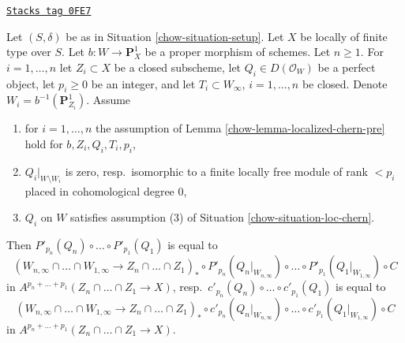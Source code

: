 \begin{lemma}
\label{chow-lemma-homomorphism-final}
\href{https://stacks.math.columbia.edu/tag/0FE7}{\texttt{Stacks tag 0FE7}}

Let $(S, \delta)$ be as in Situation \ref{chow-situation-setup}. Let $X$ be
locally of finite type over $S$. Let $b : W \longrightarrow \mathbf{P}^1_X$
be a proper morphism of schemes. Let $n \geq 1$. For $i = 1, \ldots, n$
let $Z_i \subset X$ be a closed subscheme, let $Q_i \in D(\mathcal{O}_W)$
be a perfect object, let $p_i \geq 0$ be an integer, and let
$T_i \subset W_\infty$, $i = 1, \ldots, n$ be closed.
Denote $W_i = b^{-1}(\mathbf{P}^1_{Z_i})$. Assume
\begin{enumerate}
\item for $i = 1, \ldots, n$ the assumption of
Lemma \ref{chow-lemma-localized-chern-pre} hold for
$b, Z_i, Q_i, T_i, p_i$,
\item $Q_i|_{W \setminus W_i}$ is zero, resp.\ isomorphic to a finite
locally free module of rank $< p_i$ placed in cohomological degree $0$,
\item $Q_i$ on $W$ satisfies
assumption (3) of Situation \ref{chow-situation-loc-chern}.
\end{enumerate}
Then $P'_{p_n}(Q_n) \circ \ldots \circ P'_{p_1}(Q_1)$ is equal to
$$
(W_{n, \infty} \cap \ldots \cap W_{1, \infty} \to
Z_n \cap \ldots \cap Z_1)_* \circ
P'_{p_n}(Q_n|_{W_{n, \infty}}) \circ \ldots \circ P'_{p_1}(Q_1|_{W_{1, \infty}})
\circ C
$$
in $A^{p_n + \ldots + p_1}(Z_n \cap \ldots \cap Z_1 \to X)$,
resp.\ $c'_{p_n}(Q_n) \circ \ldots \circ c'_{p_1}(Q_1)$ is equal to
$$
(W_{n, \infty} \cap \ldots \cap W_{1, \infty} \to
Z_n \cap \ldots \cap Z_1)_* \circ
c'_{p_n}(Q_n|_{W_{n, \infty}}) \circ \ldots \circ c'_{p_1}(Q_1|_{W_{1, \infty}})
\circ C
$$
in $A^{p_n + \ldots + p_1}(Z_n \cap \ldots \cap Z_1 \to X)$.
\end{lemma}

